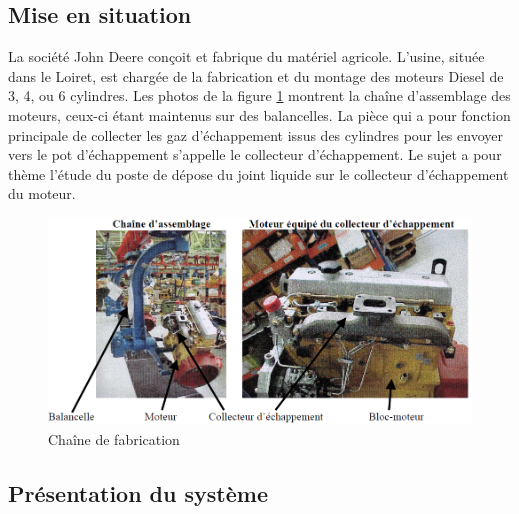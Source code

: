 \subsection{Mise en situation}

La société John Deere conçoit et fabrique du matériel agricole. L'usine, située dans le Loiret, est chargée de la fabrication et du montage des moteurs Diesel de 3, 4, ou 6 cylindres.
Les photos de la figure \ref{fig:image1} montrent la chaîne d'assemblage des moteurs, ceux-ci étant maintenus sur des balancelles.
La pièce qui a pour fonction principale de collecter les gaz d'échappement issus des cylindres pour les envoyer vers le pot d'échappement s'appelle le collecteur d'échappement.
Le sujet a pour thème l'étude du poste de dépose du joint liquide sur le collecteur d'échappement du moteur.


\begin{figure}[htbp]
\begin{center}
\includegraphics[width=0.7\linewidth]{img/Image2.png}
\caption{Chaîne de fabrication}
\label{fig:image1}
\end{center}
\end{figure}

\subsection{Présentation du système}

